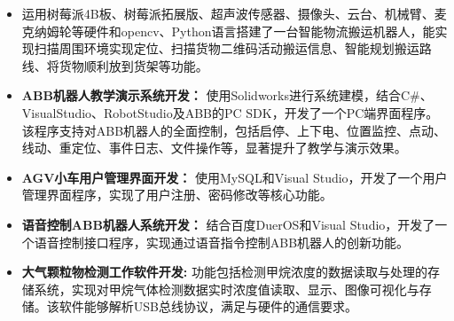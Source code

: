 \begin{itemize}
  \item 运用树莓派4B板、树莓派拓展版、超声波传感器、摄像头、云台、机械臂、麦克纳姆轮等硬件和opencv、Python语言搭建了一台智能物流搬运机器人，能实现扫描周围环境实现定位、扫描货物二维码活动搬运信息、智能规划搬运路线、将货物顺利放到货架等功能。 
\end{itemize}


\begin{itemize}
    \item \textbf{ABB机器人教学演示系统开发：} 使用Solidworks进行系统建模，结合C\#、VisualStudio、RobotStudio及ABB的PC SDK，开发了一个PC端界面程序。该程序支持对ABB机器人的全面控制，包括启停、上下电、位置监控、点动、线动、重定位、事件日志、文件操作等，显著提升了教学与演示效果。
    \item \textbf{AGV小车用户管理界面开发：} 使用MySQL和Visual Studio，开发了一个用户管理界面程序，实现了用户注册、密码修改等核心功能。
    \item \textbf{语音控制ABB机器人系统开发：} 结合百度DuerOS和Visual Studio，开发了一个语音控制接口程序，实现通过语音指令控制ABB机器人的创新功能。
\end{itemize}



\begin{itemize}
    \item \textbf{大气颗粒物检测工作软件开发:} 功能包括检测甲烷浓度的数据读取与处理的存储系统，实现对甲烷气体检测数据实时浓度值读取、显示、图像可视化与存储。该软件能够解析USB总线协议，满足与硬件的通信要求。 
\end{itemize}

